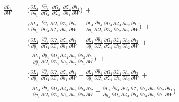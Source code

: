 \documentclass{article}
\begin{document}
\begin{align*}
	\frac{\partial L_4}{ \partial{W}} = &\biggl(\frac{\partial L_4}{\partial \hat{y}_4}~\frac{\partial \hat{y}_4}{\partial \Omega_4}~\frac{\partial \Omega_4}{ \partial \mathcal{Z}_4} ~ \frac{\partial \mathcal{Z}_4}{ \partial h_1} \frac{\partial h_1}{ \partial W} \biggl) ~+~\\
	& \biggl(\frac{\partial L_4}{\partial \hat{y}_4}~\frac{\partial \hat{y}_4}{\partial \Omega_4}\frac{\partial \Omega_4}{ \partial \mathcal{Z}_4} \frac{\partial \mathcal{Z}_4}{ \partial h_2} \frac{\partial h_2}{ \partial W} + \frac{\partial L_4}{\partial \hat{y}_4}\frac{\partial \hat{y}_4}{\partial \Omega_4}\frac{\partial \Omega_4}{ \partial \mathcal{Z}_4} \frac{\partial \mathcal{Z}_4}{ \partial h_2} \frac{\partial h_2}{ \partial h_1}\frac{\partial h_1}{ \partial W}\biggl)~+~\\
	& \biggl(
	\frac{\partial L_4}{\partial \hat{y}_4}~\frac{\partial \hat{y}_4}{\partial \Omega_4}\frac{\partial \Omega_4}{ \partial \mathcal{Z}_4} \frac{\partial \mathcal{Z}_4}{ \partial h_3} \frac{\partial h_3}{ \partial W} + \frac{\partial L_4}{\partial \hat{y}_4}\frac{\partial \hat{y}_4}{\partial \Omega_4}\frac{\partial \Omega_4}{ \partial \mathcal{Z}_4} \frac{\partial \mathcal{Z}_4}{ \partial h_3} \frac{\partial h_3}{ \partial h_2}\frac{\partial h_2}{ \partial W}~+~\\
	&~~~\frac{\partial L_4}{\partial \hat{y}_4}\frac{\partial \hat{y}_4}{\partial \Omega_4}\frac{\partial \Omega_4}{ \partial \mathcal{Z}_4} \frac{\partial \mathcal{Z}_4}{ \partial h_3} \frac{\partial h_3}{ \partial h_2}\frac{\partial h_2}{ \partial h_1}\frac{\partial h_1}{ \partial W}
	\biggl)~+~\\
	&\biggl(
	\frac{\partial L_4}{\partial \hat{y}_4}~\frac{\partial \hat{y}_4}{\partial \Omega_4}\frac{\partial \Omega_4}{ \partial \mathcal{Z}_4} \frac{\partial \mathcal{Z}_4}{ \partial h_4} \frac{\partial h_4}{ \partial W} + \frac{\partial L_4}{\partial \hat{y}_4}\frac{\partial \hat{y}_4}{\partial \Omega_4}\frac{\partial \Omega_4}{ \partial \mathcal{Z}_4} \frac{\partial \mathcal{Z}_4}{ \partial h_4} \frac{\partial h_4}{ \partial h_3}\frac{\partial h_3}{ \partial W}~+~\\
	&~~~\frac{\partial L_4}{\partial \hat{y}_4}\frac{\partial \hat{y}_4}{\partial \Omega_4}\frac{\partial \Omega_4}{ \partial \mathcal{Z}_4} \frac{\partial \mathcal{Z}_4}{ \partial h_4} \frac{\partial h_4}{ \partial h_3}\frac{\partial h_3}{ \partial h_2}\frac{\partial h_2}{ \partial W}
	+
	\frac{\partial L_4}{\partial \hat{y}_4}\frac{\partial \hat{y}_4}{\partial \Omega_4}\frac{\partial \Omega_4}{ \partial \mathcal{Z}_4} \frac{\partial \mathcal{Z}_4}{ \partial h_4} \frac{\partial h_4}{ \partial h_3}\frac{\partial h_3}{ \partial h_2}\frac{\partial h_2}{ \partial h_1}\frac{\partial h_1}{ \partial W}
	\biggl)
\end{align*}
\end{document}

